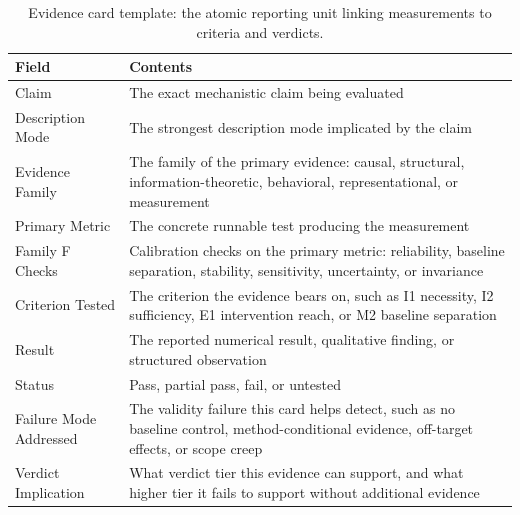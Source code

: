 \documentclass[10pt]{article}
\begin{document}
\begin{table}[H]
\centering
\small
\caption{Evidence card template: the atomic reporting unit linking measurements to criteria and verdicts.}
\renewcommand{\arraystretch}{1.2}
\begin{tabular}{@{}lp{10cm}@{}}
\toprule
\textbf{Field} & \textbf{Contents} \\
\midrule
Claim & The exact mechanistic claim being evaluated \\
\midrule
Description Mode & The strongest description mode implicated by the claim \\
\midrule
Evidence Family & The family of the primary evidence: causal, structural, information-theoretic, behavioral, representational, or measurement \\
\midrule
Primary Metric & The concrete runnable test producing the measurement \\
\midrule
Family F Checks & Calibration checks on the primary metric: reliability, baseline separation, stability, sensitivity, uncertainty, or invariance \\
\midrule
Criterion Tested & The criterion the evidence bears on, such as I1 necessity, I2 sufficiency, E1 intervention reach, or M2 baseline separation \\
\midrule
Result & The reported numerical result, qualitative finding, or structured observation \\
\midrule
Status & Pass, partial pass, fail, or untested \\
\midrule
Failure Mode Addressed & The validity failure this card helps detect, such as no baseline control, method-conditional evidence, off-target effects, or scope creep \\
\midrule
Verdict Implication & What verdict tier this evidence can support, and what higher tier it fails to support without additional evidence \\
\bottomrule
\end{tabular}
\label{tabevidencecardtemplate}
\end{table}
\end{document}
